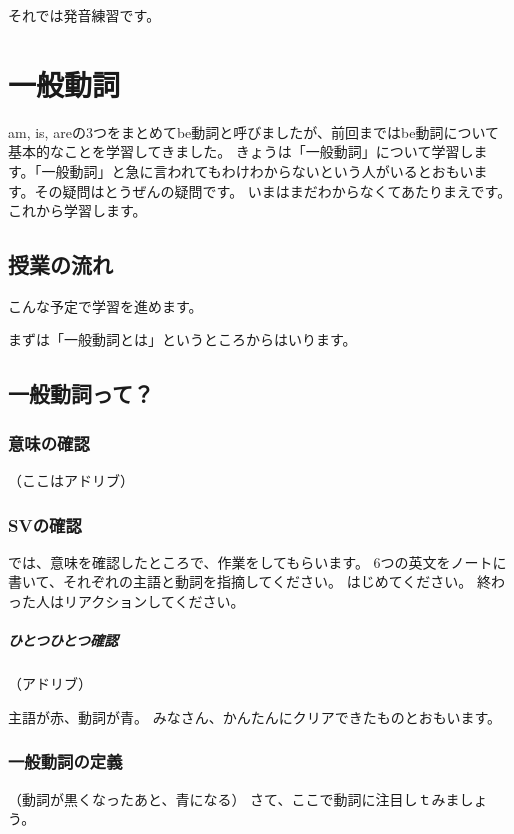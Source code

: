 \documentclass[book,jafontscale=0.9247]{jlreq}
\newcommand{\mySagyo}{%
\begin{minipage}[t]{.98\textwidth}
\mbox{}\hrulefill\mbox{}\par%
\mbox{}\hfill{}\raisebox{-5pt}{作業}\hfill\mbox{}\par%
\mbox{}\hrulefill\mbox{}
\end{minipage}%
\par%
\bigskip
}
\newcommand{\myMouse}{%
  {\large \ComputerMouse}
}
\begin{document}
それでは発音練習です。

\chapter{一般動詞}

am, is, areの3つをまとめてbe動詞と呼びましたが、前回まではbe動詞について基本的なことを学習してきました。
きょうは「一般動詞」について学習します。「一般動詞」と急に言われてもわけわからないという人がいるとおもいます。その疑問はとうぜんの疑問です。
いまはまだわからなくてあたりまえです。これから学習します。\myMouse

\section{授業の流れ}

こんな予定で学習を進めます。

まずは「一般動詞とは」というところからはいります。

\section{一般動詞って？}

\subsection{意味の確認}

（ここはアドリブ）

\subsection{SVの確認}

では、意味を確認したところで、作業をしてもらいます。
6つの英文をノートに書いて、それぞれの主語と動詞を指摘してください。
はじめてください。
終わった人はリアクションしてください。

\mySagyo


\paragraph{ひとつひとつ確認}

（アドリブ）

主語が赤、動詞が青。
みなさん、かんたんにクリアできたものとおもいます。

\subsection{一般動詞の定義}
（動詞が黒くなったあと、青になる）
さて、ここで動詞に注目しｔみましょう。
\end{document}
